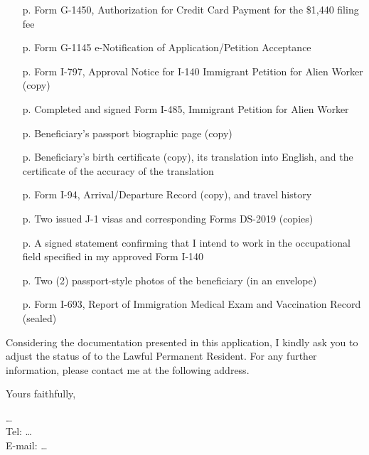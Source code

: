 \begin{itemize}
	\item [p. \pageref*{G-1450}] Form G-1450, Authorization for Credit Card
	Payment for the \$1,440 filing fee
    \item [p. \pageref*{G-1145}] Form G-1145 e-Notification of 
    Application/Petition Acceptance
	\item [p. \pageref*{I-797}] Form I-797, Approval Notice for I-140 Immigrant
	Petition for Alien Worker (copy)
   \item [p. \pageref*{I-485}] Completed and signed Form I-485, Immigrant Petition for Alien Worker
   \item [p. \pageref*{passport}] Beneficiary's passport biographic page (copy)
   \item [p. \pageref*{birth}] Beneficiary's birth certificate (copy), its
   translation into English, and the certificate of the accuracy of the
   translation
   \item [p. \pageref*{i94}] Form I-94, Arrival/Departure Record (copy), and travel history
   \item [p. \pageref*{visas}] Two issued J-1 visas and corresponding Forms
   DS-2019 (copies)
   \item [p. \pageref*{plans}] A signed statement confirming that I intend to
   work in the occupational field specified in my approved Form I-140
   \item [p. \pageref*{end}] Two (2) passport-style photos of the beneficiary (in an envelope)
   \item [p. \pageref*{end}] Form I-693, Report of Immigration Medical Exam and Vaccination Record (sealed)
\end{itemize}

Considering the documentation presented in this application, I kindly ask you to
adjust the status of \drfull to the Lawful Permanent Resident. For any further
information, please contact me at the following address.

Yours faithfully,

\vspace{4em}
\drfull

\ldots\\
Tel: \ldots\\
E-mail: \ldots


\pagebreak

\label{G-1450}

\label{G-1145}

\label{I-797}

